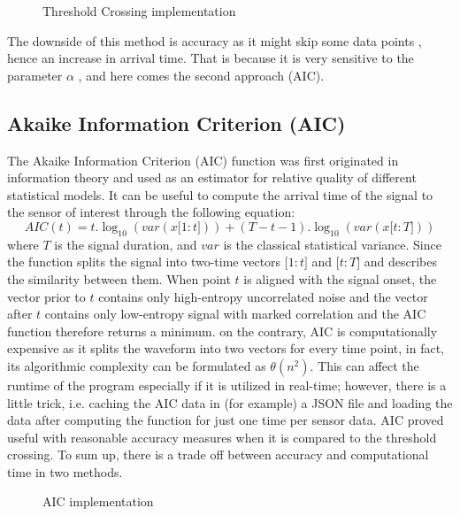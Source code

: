 \begin{figure}[htbp]
  \centering
  \scalebox{.5}{}
  \caption{Threshold Crossing implementation}
  \label{fig:label}
\end{figure}


The downside of this method is accuracy as it might skip some data
points , hence an increase in arrival time. That is because it is very
sensitive to the parameter {\(\alpha\)} , and here comes the second
approach (AIC).


\subsection{Akaike Information Criterion
(AIC)}

The Akaike Information Criterion (AIC) function was first originated in
information theory and used as an estimator for relative quality of
different statistical models. It can be useful to compute the arrival
time of the signal to the sensor of interest through the following
equation:\\
{\[AIC(t) = t.\log_{10}{(var(x\lbrack 1:t\rbrack))} + (T - t - 1).\log_{10}{(var(x\lbrack t:T\rbrack))}\]}where
{\(T\)} is the signal duration, and {\(var\)} is the classical
statistical variance. Since the function splits the signal into two-time
vectors {\(\lbrack 1:t\rbrack\)} and {\(\lbrack t:T\rbrack\)} and
describes the similarity between them. When point {\(t\)} is aligned
with the signal onset, the vector prior to {\(t\)} contains only
high-entropy uncorrelated noise and the vector after {\(t\)} contains
only low-entropy signal with marked correlation and the AIC function
therefore returns a minimum. on the contrary, AIC is computationally
expensive as it splits the waveform into two vectors for every time
point, in fact, its algorithmic complexity can be formulated as
{\(\theta(n^{2})\)}. This can affect the runtime of the program
especially if it is utilized in real-time; however, there is a little
trick, i.e. caching the AIC data in (for example) a JSON file and
loading the data after computing the function for just one time per
sensor data. AIC proved useful with reasonable accuracy measures when it
is compared to the threshold crossing. To sum up, there is a trade off
between accuracy and computational time in two methods.

\begin{figure}[htbp]
	\centering
	\scalebox{.5}{}
	\caption{AIC implementation}
	\label{fig:label}
\end{figure}

